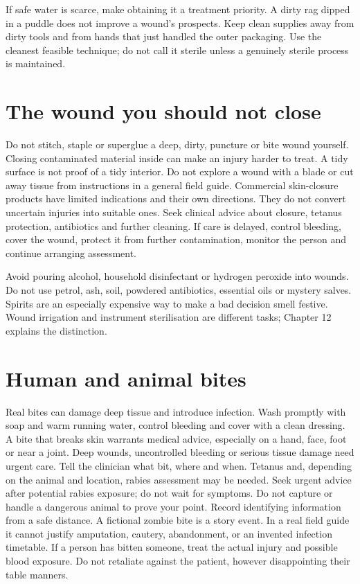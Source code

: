 \documentclass[10pt,openright]{book}
\begin{document}
If safe water is scarce, make obtaining it a treatment priority. A dirty rag dipped in a puddle does not improve a wound's prospects. Keep clean supplies away from dirty tools and from hands that just handled the outer packaging. Use the cleanest feasible technique; do not call it sterile unless a genuinely sterile process is maintained.

\section*{The wound you should not close}
Do not stitch, staple or superglue a deep, dirty, puncture or bite wound yourself. Closing contaminated material inside can make an injury harder to treat. A tidy surface is not proof of a tidy interior. Do not explore a wound with a blade or cut away tissue from instructions in a general field guide. Commercial skin-closure products have limited indications and their own directions. They do not convert uncertain injuries into suitable ones. Seek clinical advice about closure, tetanus protection, antibiotics and further cleaning. If care is delayed, control bleeding, cover the wound, protect it from further contamination, monitor the person and continue arranging assessment.

Avoid pouring alcohol, household disinfectant or hydrogen peroxide into wounds. Do not use petrol, ash, soil, powdered antibiotics, essential oils or mystery salves. Spirits are an especially expensive way to make a bad decision smell festive. Wound irrigation and instrument sterilisation are different tasks; Chapter 12 explains the distinction.

\section*{Human and animal bites}
Real bites can damage deep tissue and introduce infection. Wash promptly with soap and warm running water, control bleeding and cover with a clean dressing. A bite that breaks skin warrants medical advice, especially on a hand, face, foot or near a joint. Deep wounds, uncontrolled bleeding or serious tissue damage need urgent care. Tell the clinician what bit, where and when. Tetanus and, depending on the animal and location, rabies assessment may be needed. Seek urgent advice after potential rabies exposure; do not wait for symptoms. Do not capture or handle a dangerous animal to prove your point. Record identifying information from a safe distance. A fictional zombie bite is a story event. In a real field guide it cannot justify amputation, cautery, abandonment, or an invented infection timetable. If a person has bitten someone, treat the actual injury and possible blood exposure. Do not retaliate against the patient, however disappointing their table manners.
\end{document}
